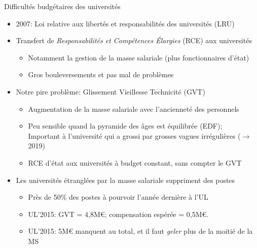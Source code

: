 \documentclass[10pt,final,usepdftitle=false]{beamer}
\begin{document}
\begin{frame}{Difficultés budgétaires des universités} 
\begin{itemize}
\item 2007: Loi relative aux libertés et responsabilités des universités (LRU)
\item Transfert de \textsl{Responsabilités et Compétences Élargies} (RCE) aux
  universités
  \begin{itemize}
  \item Notamment la gestion de la masse salariale (plus fonctionnaires d'état)
  \item Gros bouleversements et pas mal de problèmes
  \end{itemize}

\item Notre pire problème: \alert{Glissement Vieillesse Technicité (GVT)}
  \begin{itemize}
  \item Augmentation de la masse salariale avec l'ancienneté des personnels
  \item Peu sensible quand la pyramide des âges est équilibrée (EDF);\\
    Important à l'université qui a grossi par grosses vagues irrégulières
    ($\rightarrow$2019)
  \item RCE d'état aux universités à \alert{budget constant},
    sans compter le GVT
  \end{itemize}
\pause
\item Les universités étranglées par la masse salariale suppriment des postes
  \begin{itemize}
  \item Près de 50\% des postes à pourvoir l'année dernière à l'UL
  \item UL'2015: GVT = 4,8M\euro{}; compensation espérée = 0,5M\euro{}.
  \item UL'2015: 5M\euro{} manquent au total, et il faut \textit{geler} plus de
    la moitié de la MS
  \end{itemize}
\end{itemize}
\end{frame}
\end{document}
